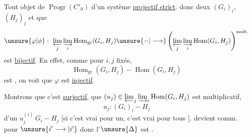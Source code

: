 Tout objet de $\operatorname{Progr}(C'_0)$  d'un système \uline{projectif strict}.  donc deux $(G_i)_i$, $(H_j)_j$ et  que
\[
\unsure{\varphi|\phi}:\ \varprojlim_j\varinjlim_i\operatorname{Hom}_{\mathrm{gr}}(G_i,H_j)
\unsure{-|\longrightarrow}
\left(\varprojlim_j\varinjlim_i\operatorname{Hom}(G_i,H_j)\right)^{\mathrm{mult.}}
\]
est \uline{bijectif}. En effet, comme pour $i,j$ fixés,
\[
\operatorname{Hom}_{\mathrm{gr}}(G_i,H_j)-\operatorname{Hom}(G_i,H_j)
\]
est , on voit que $\varphi$ est \uline{injectif}. 

Montrons que c'est \uline{surjectif},   que  $(u_j)\in\varprojlim_j\varinjlim_i\operatorname{Hom}(G_i,H_j)$ est multiplicatif, 
\[
u_j:(G_i)_i-H_j
\]
 d'un $u_j^{(i)}\ G_i-H_j$  
[si c'est vrai pour un, c'est vrai pour tous ].
 devient comm. pour $\unsure{i'\longrightarrow|i'}$ 
donc l'$\unsure{\Delta}$ est  .
